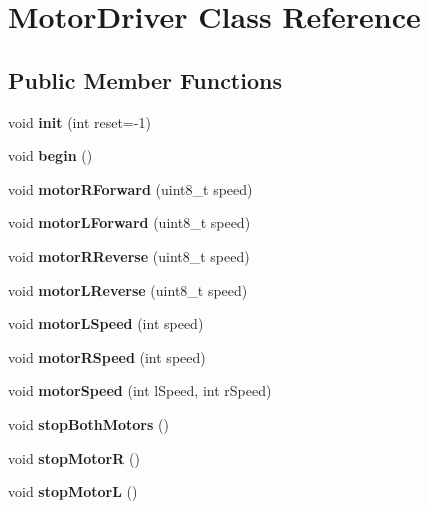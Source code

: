 \hypertarget{classMotorDriver}{}\section{Motor\+Driver Class Reference}
\label{classMotorDriver}
\subsection*{Public Member Functions}
\begin{DoxyCompactItemize}
\item 
\mbox{\label{classMotorDriver_ab763cbf76d38f3357188e483c8cd87bc}} 
void {\bfseries init} (int reset=-\/1)
\item 
\mbox{\label{classMotorDriver_a35a620c31c73aa47b8e76a6552cf670b}} 
void {\bfseries begin} ()
\item 
\mbox{\label{classMotorDriver_a3dd76c4a59d4b77cd2efc132e7a713ce}} 
void {\bfseries motor\+R\+Forward} (uint8\+\_\+t speed)
\item 
\mbox{\label{classMotorDriver_adf9704bce79ad86a155ea626790b1234}} 
void {\bfseries motor\+L\+Forward} (uint8\+\_\+t speed)
\item 
\mbox{\label{classMotorDriver_a8661e41d444ca8ea0e61b30d9473918e}} 
void {\bfseries motor\+R\+Reverse} (uint8\+\_\+t speed)
\item 
\mbox{\label{classMotorDriver_aaba1e81765924194773489637a2e66d6}} 
void {\bfseries motor\+L\+Reverse} (uint8\+\_\+t speed)
\item 
\mbox{\label{classMotorDriver_a8c4458f619f1f9148262dcd8b1dcc24a}} 
void {\bfseries motor\+L\+Speed} (int speed)
\item 
\mbox{\label{classMotorDriver_ac7127952869669dc12feeb9996220f58}} 
void {\bfseries motor\+R\+Speed} (int speed)
\item 
\mbox{\label{classMotorDriver_a3b53531a213492c8755cf77d38d0959a}} 
void {\bfseries motor\+Speed} (int l\+Speed, int r\+Speed)
\item 
\mbox{\label{classMotorDriver_a4e7f943151af4edb180309445b9df05b}} 
void {\bfseries stop\+Both\+Motors} ()
\item 
\mbox{\label{classMotorDriver_a58a3ff1022bba480555321375bc65696}} 
void {\bfseries stop\+MotorR} ()
\item 
\mbox{\label{classMotorDriver_a4703cdb94bfb18b82a5a82f0ec4d5279}} 
void {\bfseries stop\+MotorL} ()
\end{DoxyCompactItemize}
